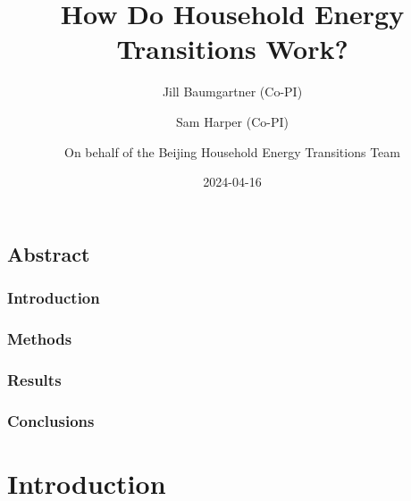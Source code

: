 \documentclass[
  letterpaper,
  DIV=11,
  numbers=noendperiod]{scrartcl}
\title{How Do Household Energy Transitions Work?}
\author{Jill Baumgartner (Co-PI) \and Sam Harper (Co-PI) \and On behalf
of the Beijing Household Energy Transitions Team}
\date{2024-04-16}
\renewcommand*\contentsname{Table of contents}
\newcommand\contentsname{Table of contents}
\begin{document}
\maketitle
\ifdefined\Shaded\renewenvironment{Shaded}{\begin{tcolorbox}[sharp corners, borderline west={3pt}{0pt}{shadecolor}, breakable, enhanced, frame hidden, boxrule=0pt, interior hidden]}{\end{tcolorbox}}\fi

\renewcommand*\contentsname{Table of contents}
{
\hypersetup{linkcolor=}
\setcounter{tocdepth}{3}
\tableofcontents
}
\hypertarget{abstract}{%
\subsection*{Abstract}\label{abstract}}

\hypertarget{introduction}{%
\subsubsection*{Introduction}\label{introduction}}

\hypertarget{methods}{%
\subsubsection*{Methods}\label{methods}}

\hypertarget{results}{%
\subsubsection*{Results}\label{results}}

\hypertarget{conclusions}{%
\subsubsection*{Conclusions}\label{conclusions}}

\hypertarget{introduction-1}{%
\section{Introduction}\label{introduction-1}}
\end{document}
